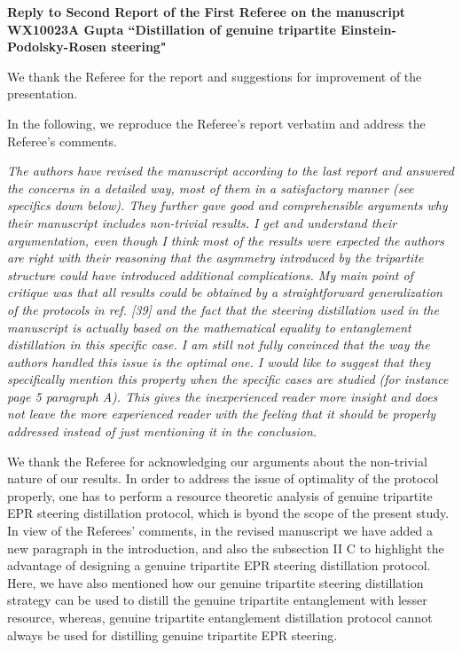 \documentclass[12pt]{revtex4-1}
\newcommand{\red}{\color[rgb]{0.8,0,0}}
\newcommand{\blue}{\color[rgb]{0,0,0.6}}
\begin{document}
\begin{center}
  \textbf{Reply to Second Report of the First Referee  on the manuscript WX10023A Gupta ``Distillation of genuine tripartite Einstein-Podolsky-Rosen steering"}
\end{center}

We thank the Referee for the report and suggestions for improvement of
the presentation. 

In the following, we reproduce the Referee's report verbatim and address the Referee's comments.

{\red{\bf{Referee's Comment:}}} \textit{The authors have revised the manuscript according to the last report
and answered the concerns in a detailed way, most of them in a
satisfactory manner (see specifics down below). They further gave good
and comprehensible arguments why their manuscript includes non-trivial
results. I get and understand their argumentation, even though I think
most of the results were expected the authors are right with their
reasoning that the asymmetry introduced by the tripartite structure
could have introduced additional complications. My main point of
critique was that all results could be obtained by a straightforward
generalization of the protocols in ref. [39] and the fact that the
steering distillation used in the manuscript is actually based on the
mathematical equality to entanglement distillation in this specific
case. I am still not fully convinced that the way the authors handled
this issue is the optimal one. I would like to suggest that they
specifically mention this property when the specific cases are studied
(for instance page 5 paragraph A). This gives the inexperienced reader
more insight and does not leave the more experienced reader with the
feeling that it should be properly addressed instead of just
mentioning it in the conclusion. 
}

{\blue{\bf{Author's Response:}}} We thank the Referee for acknowledging our arguments 
about the non-trivial nature of our results.  In order to address the issue of optimality of the protocol properly, one has to perform a resource theoretic analysis of 
genuine tripartite EPR  steering distillation protocol, which is byond the scope of the present study. In view of the Referees' comments, in the revised manuscript we have added a new paragraph in the introduction, and also the subsection II C to highlight
the advantage of designing a genuine tripartite EPR steering distillation protocol. Here, we have also mentioned how our genuine tripartite steering distillation strategy can be used 
to distill the genuine tripartite entanglement with lesser resource, whereas, genuine tripartite entanglement distillation protocol cannot always be used for distilling genuine tripartite EPR steering. \\
 
\end{document}
